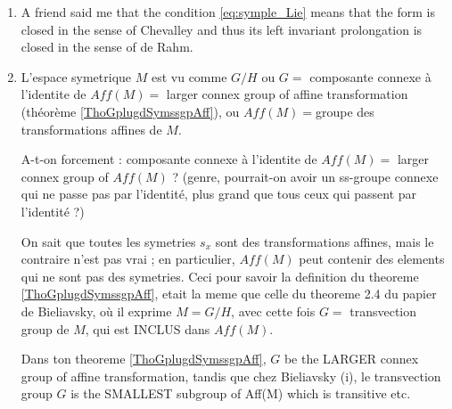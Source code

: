 
\begin{enumerate}
    \item
        A friend said me that the condition \eqref{eq:symple_Lie} means that the form is closed in the sense of Chevalley and thus its left invariant prolongation is closed in the sense of de Rahm.
    \item

	L’espace symetrique $M$ est vu comme $G/H$ ou $G =$ composante connexe à l’identite de $Aff(M) =$ larger connex group of affine transformation (théorème \ref{ThoGplugdSymssgpAff}), ou $Aff(M)=$groupe des transformations affines de $M$.

A-t-on forcement : composante connexe à l’identite de $Aff(M)  =$ larger connex group of $Aff(M)$ ?
(genre, pourrait-on avoir un ss-groupe connexe qui ne passe pas par l’identité, plus grand que tous ceux qui passent par l’identité ?) 

On sait que toutes les symetries $s_x$ sont des transformations affines, mais le contraire n’est pas vrai ; en particulier, $Aff(M)$  peut contenir des elements qui ne sont pas des symetries.  Ceci pour savoir la definition du theoreme  \ref{ThoGplugdSymssgpAff}, etait la meme que celle du theoreme 2.4 du papier de Bieliavsky, où il exprime $M=G/H$, avec cette fois $G =$ transvection group de $M$, qui est INCLUS dans $Aff(M)$. 

Dans ton theoreme \ref{ThoGplugdSymssgpAff}, $G$ be the LARGER connex group of affine transformation, tandis que chez Bieliavsky (i), le transvection group $G$ is the SMALLEST subgroup of Aff(M) which is transitive etc.

\end{enumerate}

